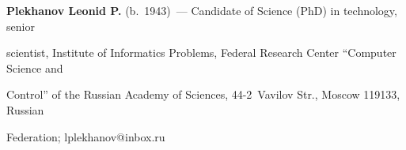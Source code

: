 \Contrl





\noindent


\textbf{Plekhanov Leonid P.} (b.\ 1943)~--- Candidate of Science (PhD) in technology, senior 


scientist, Institute of Informatics Problems, Federal Research Center ``Computer Science and 


Control'' of the Russian Academy of Sciences, 44-2~Vavilov Str., Moscow 119133, Russian 


Federation; \mbox{lplekhanov@inbox.ru}








\label{end\stat}








\renewcommand{\bibname}{\protect\rm Литература}


       


